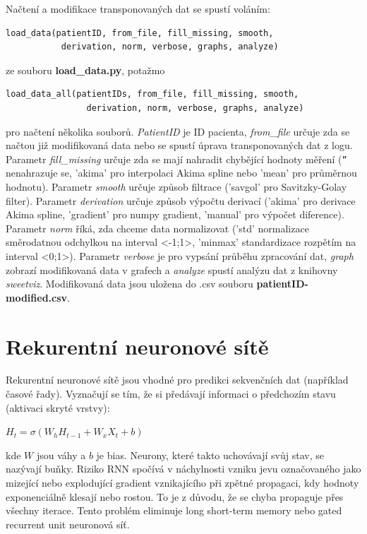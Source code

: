 Načtení a modifikace transponovaných dat se spustí voláním:
\begin{verbatim}
load_data(patientID, from_file, fill_missing, smooth,
           derivation, norm, verbose, graphs, analyze)
\end{verbatim}
ze souboru \textbf{load\_data.py}, potažmo
\begin{verbatim}
load_data_all(patientIDs, from_file, fill_missing, smooth,
                derivation, norm, verbose, graphs, analyze)
\end{verbatim}
pro načtení několika souborů. \textit{PatientID} je ID pacienta, \textit{from\_file} určuje zda se načtou již modifikovaná data nebo se spustí úprava transponovaných dat z logu. Parametr \textit{fill\_missing} určuje zda se mají nahradit chybějící hodnoty měření (\texttt{''} nenahrazuje se, 'akima' pro interpolaci Akima spline nebo 'mean' pro průměrnou hodnotu). Parametr \textit{smooth} určuje způsob filtrace ('savgol' pro Savitzky-Golay filter). Parametr \textit{derivation} určuje způsob výpočtu derivací ('akima' pro derivace Akima spline, 'gradient' pro numpy gradient, 'manual' pro výpočet diference). Parametr \textit{norm} říká, zda chceme data normalizovat ('std' normalizace směrodatnou odchylkou na interval <-1;1>, 'minmax' standardizace rozpětím na interval <0;1>). Parametr \textit{verbose} je pro vypsání průběhu zpracování dat, \textit{graph} zobrazí modifikovaná data v grafech a \textit{analyze} spustí analýzu dat z knihovny \textit{sweetviz}. Modifikovaná data jsou uložena do .csv souboru \textbf{patientID-modified.csv}.


\section{Rekurentní neuronové sítě}
\label{ch:lstm}

Rekurentní neuronové sítě jsou vhodné pro predikci sekvenčních dat (například časové řady). Vyznačují se tím, že si předávají informaci o předchozím stavu (aktivaci skryté vrstvy):

$H_{t}=\sigma (W_{h}H_{t-1}+W_{x}X_{t}+b)$

\noindent kde $W$ jsou váhy a $b$ je bias. Neurony, které takto uchovávají svůj stav, se nazývají buňky. Riziko RNN spočívá v náchylnosti vzniku jevu označovaného jako mizející nebo explodující gradient vznikajícího při zpětné propagaci, kdy hodnoty exponenciálně klesají nebo rostou. To je z důvodu, že se chyba propaguje přes všechny iterace. Tento problém eliminuje long short-term memory nebo gated recurrent unit neuronová síť.

